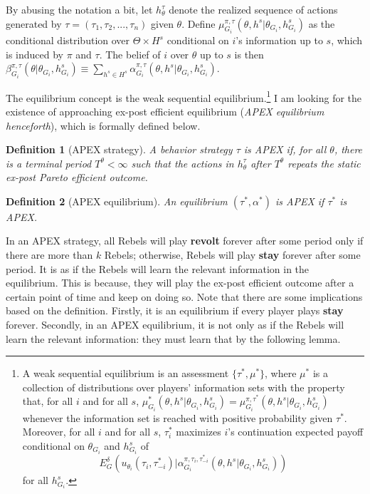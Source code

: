 \documentclass[12pt,letter]{article}
\newtheorem{definition}{Definition}[section]
\theoremstyle{definition}
\theoremstyle{remark}
\theoremstyle{claim}
\begin{document}
By abusing the notation a bit, let $h^{\tau}_\theta$ denote the realized sequence of actions generated by $\tau=(\tau_1,\tau_2,...,\tau_n)$ given $\theta$. Define $\mu^{\pi,\tau}_{G_i}(\theta, h^{s}|\theta_{G_i},h^{s}_{G_i})$ as the conditional distribution over $\Theta\times H^s$ conditional on $i$'s information up to $s$, which is induced by $\pi$ and $\tau$. The belief of $i$ over $\theta$ up to $s$ is then $\beta^{\pi,\tau}_{G_i}(\theta|\theta_{G_i},h^{s}_{G_i})\equiv \sum_{h^{s}\in H^s}\alpha^{\pi,\tau}_{G_i}(\theta, h^{s}|\theta_{G_i},h^{s}_{G_i})$.

The equilibrium concept is the weak sequential equilibrium.\footnote{A weak sequential equilibrium is an assessment $\{\tau^{*}, \mu^{*}\}$, where $\mu^{*}$ is a collection of distributions over players' information sets with the property that, for all $i$ and for all $s$, $\mu^{*}_{G_i}(\theta, h^{s}|\theta_{G_i},h^{s}_{G_i})=\mu^{\pi,\tau^{*}}_{G_i}(\theta, h^{s}|\theta_{G_i},h^{s}_{G_i})$ whenever the information set is reached with positive probability given $\tau^{*}$. Moreover, for all $i$ and for all $s$, $\tau^{*}_{i}$ maximizes $i$'s continuation expected payoff conditional on $\theta_{G_i}$ and $h^{s}_{G_i}$ of
\[E^{\delta}_G(u_{\theta_i}(\tau_{i},\tau^{*}_{-i})|\alpha^{\pi,\tau_{i},\tau^{*}_{-i}}_{G_i}(\theta, h^{s}|\theta_{G_i},h^{s}_{G_i}))\] for all $h^{s}_{G_i}$.} 
I am looking for the existence of approaching ex-post efficient equilibrium (\textit{APEX equilibrium henceforth}), which is formally defined below.

\begin{definition}[APEX strategy]
A behavior strategy $\tau$ is APEX  if, for all $\theta$, there is a terminal period $T^{\theta}<\infty$ such that the actions in $h^{\tau}_{\theta}$ after $T^{\theta}$ repeats the static ex-post Pareto efficient outcome.
\end{definition}

\begin{definition}[APEX equilibrium]\label{Def_ex-post_efficient}
An equilibrium $(\tau^{*},\alpha^{*})$ is APEX if $\tau^{*}$ is APEX.
\end{definition}




In an APEX strategy, all Rebels will play \textbf{revolt} forever after some period only if there are more than $k$ Rebels; otherwise, Rebels will play \textbf{stay} forever after some period. It is as if the Rebels will learn the relevant information in the equilibrium. This is because, they will play the ex-post efficient outcome after a certain point of time and keep on doing so. Note that there are some implications based on the definition. Firstly, it is an equilibrium if every player plays \textbf{stay} forever. Secondly, in an APEX equilibrium, it is not only as if the Rebels will learn the relevant information: they must learn that by the following lemma. 
\end{document}
